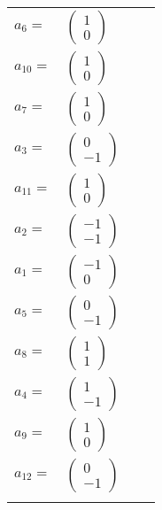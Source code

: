 \documentclass[1p]{elsarticle_modified}
\theoremstyle{definition}
\begin{document}
\begin{tabular}{m{7pt} m{180pt} m{7pt} m{180pt} }
\flushright $a_{6}=$&$\begin{pmatrix}1\\0\end{pmatrix}$ \\
\flushright $a_{10}=$&$\begin{pmatrix}1\\0\end{pmatrix}$ \\
\flushright $a_{7}=$&$\begin{pmatrix}1\\0\end{pmatrix}$ \\
\flushright $a_{3}=$&$\begin{pmatrix}0\\-1\end{pmatrix}$ \\
\flushright $a_{11}=$&$\begin{pmatrix}1\\0\end{pmatrix}$ \\
\flushright $a_{2}=$&$\begin{pmatrix}-1\\-1\end{pmatrix}$ \\
\flushright $a_{1}=$&$\begin{pmatrix}-1\\0\end{pmatrix}$ \\
\flushright $a_{5}=$&$\begin{pmatrix}0\\-1\end{pmatrix}$ \\
\flushright $a_{8}=$&$\begin{pmatrix}1\\1\end{pmatrix}$ \\
\flushright $a_{4}=$&$\begin{pmatrix}1\\-1\end{pmatrix}$ \\
\flushright $a_{9}=$&$\begin{pmatrix}1\\0\end{pmatrix}$ \\
\flushright $a_{12}=$&$\begin{pmatrix}0\\-1\end{pmatrix}$\\&\end{tabular}
\end{document}
